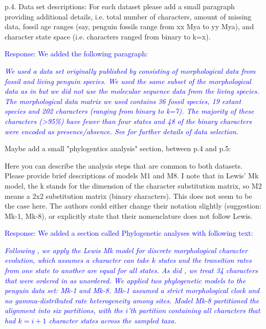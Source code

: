 \documentclass[11pt]{article}
\newcommand{\response}[1]{\medskip{}\textcolor{blue}{{Response: #1}}\medskip{}}
\newcommand{\respquote}[1]{{\medskip{}\textcolor{blue}{{\it #1}}\medskip{}}}
\begin{document}
p.4. Data set descriptions: For each dataset please add a small paragraph providing additional details, i.e. total number of characters, amount of missing data, fossil age ranges (say, penguin fossils range from xx Mya to yy Mya), and character state space (i.e. characters ranged from binary to k=x).

\response{We added the following paragraph:}

\respquote{We used a data set originally published by \cite{ksepka2012} consisting of morphological data from fossil and living penguin 
species. 
We used the same subset of the morphological data as in \cite{gavryushkina2015bayesian} but we did not use the molecular sequence data from the living species. 
The morphological data matrix we used contains 36 fossil species, 19 extant species and 202 characters (ranging from binary to k=7). 
The majority of these characters (\textgreater 95\%) have fewer than four states and 48 of the binary characters were encoded as presence/absence. 
See \cite{gavryushkina2015bayesian} for further details of data selection.}

Maybe add a small "phylogentics analysis" section, between p.4 and p.5: 

Here you can describe the analysis steps that are common to both datasets. Please provide brief descriptions of models M1 and M8. I note that in Lewis' Mk model, the k stands for the dimension of the character substitution matrix, so M2 means a 2x2 substitution matrix (binary characters). This does not seem to be the case here. The authors could either change their notation slightly (suggestion: Mk-1, Mk-8), or explicitly state that their nomenclature does not follow Lewis. 

\response{We added a section called Phylogenetic analyses with following text:}

\respquote{Following \cite{gavryushkina2015bayesian}, we apply the Lewis Mk model \cite{Lewis2001} for discrete morphological character evolution, which assumes a character can take $k$ states and the transition rates from one state to another are equal for all states. As did \cite{gavryushkina2015bayesian}, we treat 34 characters that were ordered in \cite{ksepka2012} as unordered. 
We applied two phylogenetic models to the penguin data set: Mk-1 and Mk-8. Mk-1 assumed a strict morphological clock and no gamma-distributed rate heterogeneity among sites. Model Mk-8 partitioned the alignment into six partitions, with the $i$'th partition containing all characters that had $k=i+1$ character states across the sampled taxa.}
\end{document}
